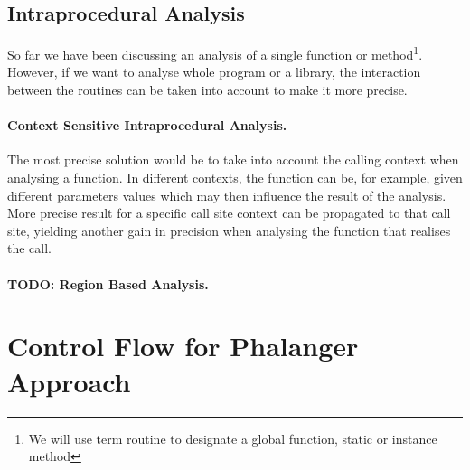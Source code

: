            

        \subsection{Intraprocedural Analysis}
        So far we have been discussing an analysis of a 
        single function or method\footnote{We will use term 
        routine to designate a global function, static or instance method}. 
        However, if we want to analyse whole program or 
        a library, the interaction between the routines 
        can be taken into account to make it more precise.
        
        \paragraph{Context Sensitive Intraprocedural Analysis.}
        The most precise solution would be to take into account 
        the calling context when analysing a function. 
        In different contexts, the function can be, 
        for example, given different parameters values 
        which may then influence the result of the analysis. 
        More precise result for a specific call site context 
        can be propagated to that call site, 
        yielding another gain in precision when 
        analysing the function that realises the call.
        
        \paragraph{TODO: Region Based Analysis.}
        
        \paragraph*{}
    
    \section{Control Flow for Phalanger Approach}
        
